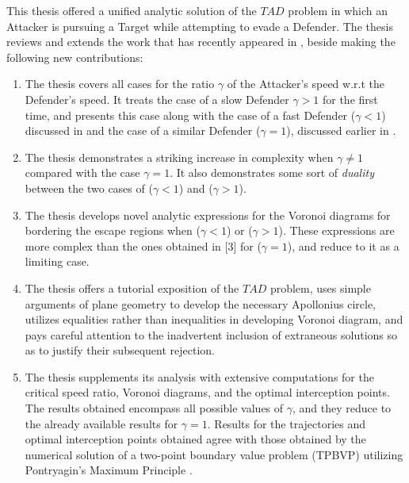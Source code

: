 \label{conclusions}

This thesis offered a unified analytic solution of the $TAD$ problem in which an Attacker is pursuing a Target while attempting to evade a Defender. The thesis reviews and extends the work that has recently appeared in \cite{pachter2014active,garcia2015active,garcia2015escape}, beside making the following new contributions:

\begin{enumerate}
\item The thesis covers all cases for the ratio $\gamma$ of the Attacker's speed w.r.t the Defender's speed. It treats the case of a slow Defender $\gamma>1$ for the first time, and presents this case along with the case of a fast Defender ($\gamma<1$) discussed in \cite{garcia2015active} and the case of a similar Defender ($\gamma=1$), discussed earlier in \cite{pachter2014active,garcia2015escape}.
\item The thesis demonstrates a striking increase in complexity when $\gamma\neq1$ compared with the case $\gamma=1$. It also demonstrates some sort of \textit{duality} between the two cases of ($\gamma<1$) and ($\gamma>1$).
\item The thesis develops novel analytic expressions for the Voronoi diagrams for bordering the escape regions when ($\gamma<1$) or ($\gamma>1$). These expressions are more complex than the ones obtained in [3] for ($\gamma=1$), and reduce to it as a limiting case.
\item The thesis offers a tutorial exposition of the $TAD$ problem, uses simple arguments of plane geometry to develop the necessary Apollonius circle, utilizes equalities rather than inequalities in developing Voronoi diagram, and pays careful attention to the inadvertent inclusion of extraneous solutions so as to justify their subsequent rejection.
\item The thesis supplements its analysis with extensive computations for the critical speed ratio, Voronoi diagrams, and the optimal interception points. The results obtained encompass all possible values of $\gamma$, and they reduce to the already available results for $\gamma=1$. Results for the trajectories and optimal interception points obtained agree with those obtained by the numerical solution of a two-point boundary value problem (TPBVP) utilizing Pontryagin's Maximum Principle \cite{garcia2015active}.     
\end{enumerate}  


